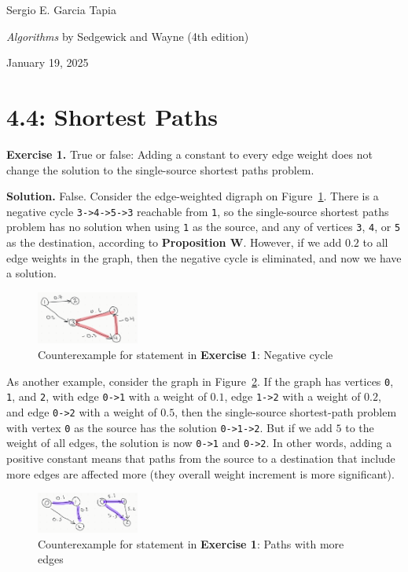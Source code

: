 \documentclass[12pt, a4paper]{article}
\newenvironment{ex}[2][Exercise]
{\par\medskip\noindent \textbf{#1 #2.}}
{\medskip}
\newenvironment{sol}[1][Solution]
{\par\medskip\noindent \textbf{#1.} }
{\medskip}
\begin{document}
	\noindent Sergio E. Garcia Tapia \hfill
	
	\noindent \emph{Algorithms} by Sedgewick and Wayne (4th edition) \cite{sedgewick_wayne}\hfill
	
	\noindent January 19, 2025\hfill 
	\section*{4.4: Shortest Paths}
	\begin{ex}{1}
		True or false: Adding a constant to every edge weight does not change the solution
		to the single-source shortest paths problem.
	\end{ex}
	\begin{sol}
		False. Consider the edge-weighted digraph on Figure~\ref{fig:ex-01a}. There is
		a negative cycle \texttt{3->4->5->3} reachable from \texttt{1}, so the single-source
		shortest paths problem has no solution when using \texttt{1} as the source,
		and any of vertices \texttt{3}, \texttt{4}, or \texttt{5} as the destination,
		according to \textbf{Proposition W}. However, if we add $0.2$ to all edge
		weights in the graph, then the negative cycle is eliminated, and now we have
		a solution.
		\begin{figure}
			\centering
			\includegraphics[width=0.3\textwidth]{exercise-01-a}
			\caption{Counterexample for statement in \textbf{Exercise 1}: Negative cycle}
			\label{fig:ex-01a}
		\end{figure}
		
		As another example, consider the graph in Figure~\ref{fig:ex-01-b}.
		If the graph has vertices \texttt{0}, \texttt{1}, and \texttt{2},
		with edge \texttt{0->1} with a weight of $0.1$, edge \texttt{1->2} with
		a weight of $0.2$, and edge \texttt{0->2} with a weight of $0.5$,
		then the single-source shortest-path problem with vertex \texttt{0}
		as the source has the solution \texttt{0->1->2}. But if we add
		$5$ to the weight of all edges, the solution is now \texttt{0->1} and
		\texttt{0->2}. In other words, adding a positive constant means that
		paths from the source to a destination that include more edges
		are affected more (they overall weight increment is more significant).
		\begin{figure}
			\centering
			\includegraphics[width=0.3\textwidth]{exercise-01-b}
			\caption{Counterexample for statement in \textbf{Exercise 1}: Paths with more edges}
			\label{fig:ex-01-b}
		\end{figure}
	\end{sol}
\end{document}
